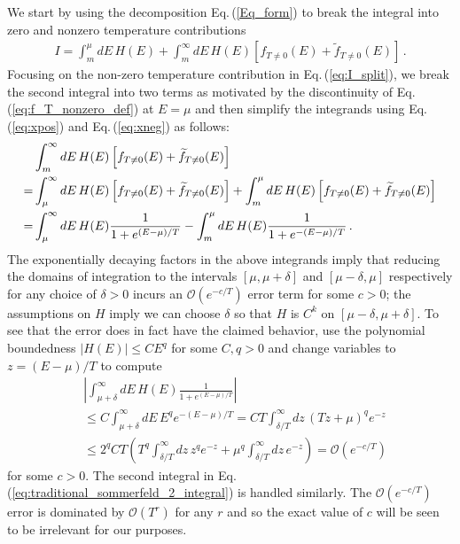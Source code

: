 \documentclass[sn-mathphys,Numbered]{sn-jnl}
\newcommand{\req}[1]{Eq.\,(\ref{#1})}
\begin{document}
We start by using the decomposition \req{Eq_form} to break the integral into zero and nonzero temperature contributions
\begin{align}\label{eq:I_split}
 I= \int_m^\mu dE\, H(E) +\int_m^\infty dE\, H(E) \left[f_{T\neq 0}(E)+\widetilde{f}_{T\neq 0}(E)\right]\,.
\end{align}
Focusing on the non-zero temperature contribution in \req{eq:I_split}, we break the second integral into two terms as motivated by the discontinuity of \req{eq:f_T_nonzero_def} at $E=\mu$ and then simplify the integrands using \req{eq:xpos} and \req{eq:xneg} as follows:
\begin{align}
 &\int_m^\infty dE\,H(E) \left[f_{T\neq 0}(E)+\widetilde{f}_{T\neq 0}(E)\right]\\
=& \int_\mu^\infty dE\,H(E) \left[f_{T\neq 0}(E)+\widetilde{f}_{T\neq 0}(E)\right]+ \int_m^\mu dE\,H(E) \left[f_{T\neq 0}(E)+\widetilde{f}_{T\neq 0}(E)\right]\notag\\ 
=&\int_\mu^\infty dE\, H(E) \frac{1}{1+e^{(E-\mu)/T}}-\int_m^\mu dE\,H(E) \frac{1}{1+e^{-(E-\mu)/T}}\,.\label{eq:traditional_sommerfeld_2_integral}
\end{align}
The exponentially decaying factors in the above integrands imply that reducing the domains of integration to the intervals $[\mu,\mu+\delta]$ and $[\mu-\delta,\mu]$ respectively for any choice of $\delta>0$ incurs an $\mathcal{O}(e^{-c/T})$ error term for some $c>0$; the assumptions on $H$ imply we can choose $\delta$ so that $H$ is $C^k$ on $[\mu-\delta,\mu+\delta]$. To see that the error does in fact have the claimed behavior, use the polynomial boundedness $|H(E)|\leq CE^q$ for some $C,q>0$ and change variables to $z=(E-\mu)/T$ to compute
\begin{equation}\label{eq:change_limits_int_exponential_decay}
 \begin{split}
 &\left|\int_{\mu+\delta}^\infty dE\, H(E)\frac{1}{1+e^{(E-\mu)/T}}\right|\\
 &\leq C\int_{\mu+\delta}^\infty dE\,E^q e^{-(E-\mu)/T} = CT\int_{\delta/T}^\infty dz\,(Tz+\mu)^q e^{-z}\\
 &\leq 2^qCT\left(T^q \int_{\delta/T}^\infty dz\,z^q e^{-z}+\mu^q \int_{\delta/T}^\infty dz\,e^{-z}\right) =\mathcal{O}\left(e^{-c/T}\right)
 \end{split}
\end{equation}
for some $c>0$. The second integral in \req{eq:traditional_sommerfeld_2_integral} is handled similarly. The $\mathcal{O}(e^{-c/T})$ error is dominated by $\mathcal{O}(T^{r})$ for any $r$ and so the exact value of $c$ will be seen to be irrelevant for our purposes.
\end{document}

